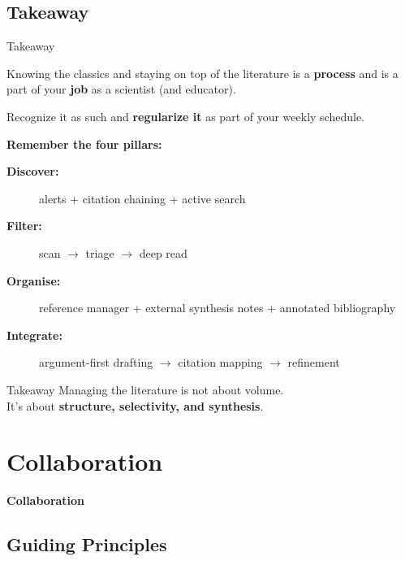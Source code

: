 \documentclass{beamer}
\begin{document}
\subsection{Takeaway}
\begin{frame}{Takeaway}

  \footnotesize

  Knowing the classics and staying on top of the literature is a \textbf{process} 
  and is a part of your \textbf{job} as a scientist (and educator).

  \smallskip
  Recognize it as such and \textbf{regularize it} as part of your weekly schedule.

  \medskip
  \textbf{Remember the four pillars:}
  \begin{description}
     \item[\textbf{Discover:}] alerts + citation chaining + active search 
    \item[\textbf{Filter:}] scan $\rightarrow$ triage $\rightarrow$ deep read
    \item[\textbf{Organise:}] reference manager + external synthesis notes + annotated bibliography
    \item[\textbf{Integrate:}] argument-first drafting $\rightarrow$ citation mapping $\rightarrow$ refinement
  \end{description}

  \medskip
  \begin{block}{Takeaway}
    Managing the literature is not about volume.\\
    It's about \textbf{structure, selectivity, and synthesis}.
  \end{block}

\end{frame}



\section{Collaboration}

\begin{frame}
  \centering
  \vfill
  {\Large\bfseries Collaboration}
  \vfill
\end{frame}


\subsection{Guiding Principles}
\end{document}
